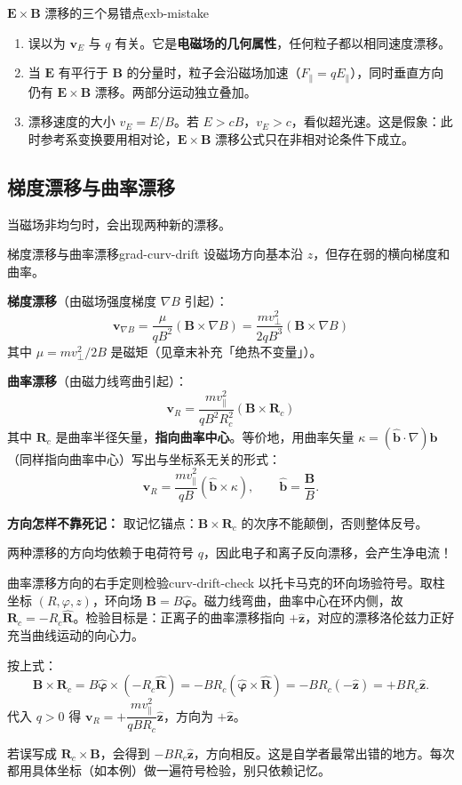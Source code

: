 \documentclass[12pt,a4paper,openany,oneside]{book}
\newcommand{\vect}[1]{\bm{#1}}
\newcommand{\unitvec}[1]{\hat{\vect{#1}}}
\newcommand{\grad}{\nabla}
\begin{document}
\begin{warning}{$\vect{E}\times\vect{B}$ 漂移的三个易错点}{exb-mistake}
\begin{enumerate}
\item 误以为 $\vect{v}_E$ 与 $q$ 有关。它是\textbf{电磁场的几何属性}，任何粒子都以相同速度漂移。
\item 当 $\vect{E}$ 有平行于 $\vect{B}$ 的分量时，粒子会沿磁场加速（$F_\parallel = qE_\parallel$），同时垂直方向仍有 $\vect{E}\times\vect{B}$ 漂移。两部分运动独立叠加。
\item 漂移速度的大小 $v_E = E/B$。若 $E > cB$，$v_E > c$，看似超光速。这是假象：此时参考系变换要用相对论，$\vect{E}\times\vect{B}$ 漂移公式只在非相对论条件下成立。
\end{enumerate}
\end{warning}

\subsection{梯度漂移与曲率漂移}

当磁场非均匀时，会出现两种新的漂移。

\begin{theorem}{梯度漂移与曲率漂移}{grad-curv-drift}
设磁场方向基本沿 $z$，但存在弱的横向梯度和曲率。

\textbf{梯度漂移}（由磁场强度梯度 $\grad B$ 引起）：
\[
\vect{v}_{\nabla B} = \frac{\mu}{qB^2}(\vect{B}\times\grad B) = \frac{m v_\perp^2}{2qB^3}(\vect{B}\times\grad B)
\]
其中 $\mu = mv_\perp^2/2B$ 是磁矩（见章末补充「绝热不变量」）。

\textbf{曲率漂移}（由磁力线弯曲引起）：
\[
\vect{v}_R = \frac{m v_\parallel^2}{qB^2 R_c^2}(\vect{B}\times\vect{R}_c)
\]
其中 $\vect{R}_c$ 是曲率半径矢量，\textbf{指向曲率中心}。等价地，用曲率矢量 $\kappa=(\unitvec{b}\cdot\grad)\unitvec{b}$（同样指向曲率中心）写出与坐标系无关的形式：
\[
\vect{v}_R = \frac{m v_\parallel^2}{qB}(\unitvec{b}\times\kappa),
\qquad \unitvec{b}=\frac{\vect{B}}{B}.
\]

\textbf{方向怎样不靠死记：} 取记忆锚点：$\vect{B}\times\vect{R}_c$ 的次序不能颠倒，否则整体反号。

两种漂移的方向均依赖于电荷符号 $q$，因此电子和离子反向漂移，会产生净电流！
\end{theorem}

\begin{insight}{曲率漂移方向的右手定则检验}{curv-drift-check}
以托卡马克的环向场验符号。取柱坐标 $(R,\varphi,z)$，环向场 $\vect{B}=B\unitvec{\varphi}$。磁力线弯曲，曲率中心在环内侧，故 $\vect{R}_c=-R_c\unitvec{R}$。检验目标是：正离子的曲率漂移指向 $+\unitvec{z}$，对应的漂移洛伦兹力正好充当曲线运动的向心力。

按上式：
\[
\vect{B}\times\vect{R}_c = B\unitvec{\varphi}\times(-R_c\unitvec{R})
= -BR_c(\unitvec{\varphi}\times\unitvec{R})
= -BR_c(-\unitvec{z}) = +BR_c\unitvec{z}.
\]
代入 $q>0$ 得 $\vect{v}_R = +\dfrac{mv_\parallel^2}{qBR_c}\unitvec{z}$，方向为 $+\unitvec{z}$。

若误写成 $\vect{R}_c\times\vect{B}$，会得到 $-BR_c\unitvec{z}$，方向相反。这是自学者最常出错的地方。每次都用具体坐标（如本例）做一遍符号检验，别只依赖记忆。
\end{insight}
\end{document}
